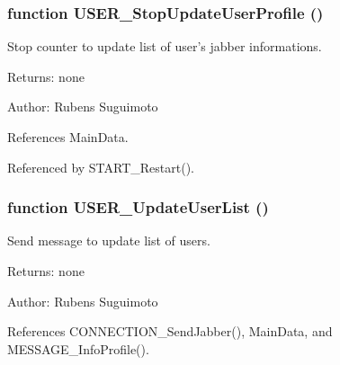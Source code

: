 \subsubsection[USER\_\-StopUpdateUserProfile]{\setlength{\rightskip}{0pt plus 5cm}function USER\_\-StopUpdateUserProfile ()}\label{contact_2user_8js_ae48fc3e53aa36be8d8715a5acaf75c0}


Stop counter to update list of user's jabber informations. 

\begin{Desc}
\item[Returns:]none \end{Desc}
\begin{Desc}
\item[Author:]Rubens Suguimoto \end{Desc}


References MainData.

Referenced by START\_\-Restart().
\subsubsection[USER\_\-UpdateUserList]{\setlength{\rightskip}{0pt plus 5cm}function USER\_\-UpdateUserList ()}\label{contact_2user_8js_0d2657b136cf49ba6ec0cff234c20091}


Send message to update list of users. 

\begin{Desc}
\item[Returns:]none \end{Desc}
\begin{Desc}
\item[Author:]Rubens Suguimoto \end{Desc}


References CONNECTION\_\-SendJabber(), MainData, and MESSAGE\_\-InfoProfile().